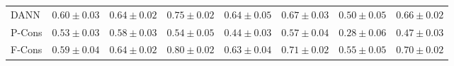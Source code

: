\begin{table}[h]
{\begin{tabular}{lccccccc}
			
			DANN &  $\mathbf{0.60 \pm 0.03}$ &  $\mathbf{0.64 \pm 0.02}$ & $0.75 \pm 0.02$ & $\mathbf{0.64 \pm 0.05}$ & $0.67 \pm 0.03$ & $0.50 \pm 0.05$  & $0.66 \pm 0.02$ \\
			
			\cmidrule{1-8}
			
			
			
			P-Cons & $0.53 \pm 0.03$ & $0.58 \pm 0.03$ & $\mathit{0.54 \pm 0.05}$ & $\mathit{0.44 \pm 0.03}$ & $\mathit{0.57 \pm 0.04}$  & $\mathit{0.28 \pm 0.06}$ & $\mathit{0.47 \pm 0.03}$  \\
			
			\cmidrule{1-8}
			
			
			
			
			
			F-Cons & $0.59 \pm 0.04$ & $\mathbf{0.64 \pm 0.02}$ & $\mathbf{0.80 \pm 0.02}$ & $\mathbf{0.63 \pm 0.04}$ & $\mathbf{0.71 \pm 0.02}$ & $\mathbf{0.55 \pm 0.05}$ & $\mathbf{0.70 \pm 0.02}$  \\
			
			\bottomrule
		\end{tabular}}
		\label{tab:res_public}
\end{table}